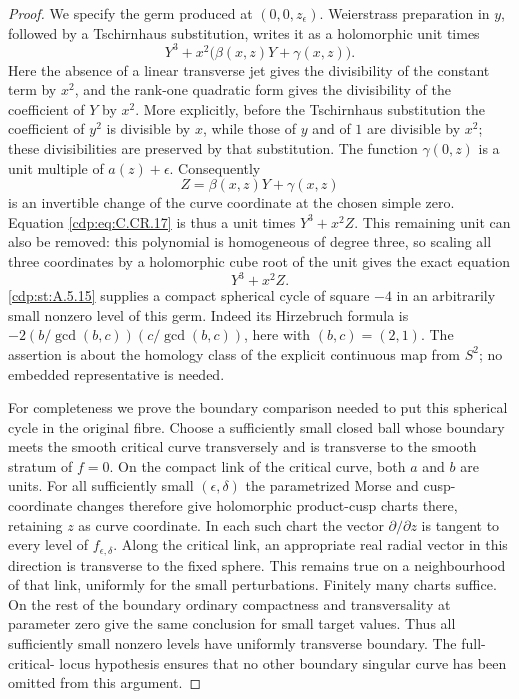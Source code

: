 \begin{proof}
We specify the germ produced at
$(0,0,z_\epsilon)$. Weierstrass preparation in $y$,
followed by a Tschirnhaus substitution, writes it as
a holomorphic unit times
\[
             Y^3+x^2\bigl(\beta(x,z)Y+\gamma(x,z)\bigr).
 \tag{C.CR.17}\label{cdp:eq:C.CR.17}
\]
Here the absence of a linear transverse jet gives
the divisibility of the constant term by $x^2$,
and the rank-one quadratic form gives the divisibility
of the coefficient of $Y$ by $x^2$. More explicitly,
before the Tschirnhaus substitution the coefficient
of $y^2$ is divisible by $x$, while those of $y$
and of $1$ are divisible by $x^2$; these divisibilities
are preserved by that substitution.
The function $\gamma(0,z)$ is a unit multiple of
$a(z)+\epsilon$. Consequently
\[
             Z=\beta(x,z)Y+\gamma(x,z)
\]
is an invertible change of the curve coordinate at
the chosen simple zero. Equation \eqref{cdp:eq:C.CR.17} is thus
a unit times $Y^3+x^2Z$. This remaining unit can
also be removed: this polynomial is homogeneous
of degree three, so scaling all three coordinates
by a holomorphic cube root of the unit gives the
exact equation
\[
                            Y^3+x^2Z.
 \tag{C.CR.18}\label{cdp:eq:C.CR.18}
\]
\ref{cdp:st:A.5.15} supplies a compact spherical cycle of square $-4$
in an arbitrarily small nonzero level of this germ.
Indeed its Hirzebruch formula is
$-2(b/\gcd(b,c))(c/\gcd(b,c))$, here with
$(b,c)=(2,1)$. The assertion is about the homology
class of the explicit continuous map from $S^2$;
no embedded representative is needed.

For completeness we prove the boundary comparison
needed to put this spherical cycle in the original fibre.
Choose a sufficiently small closed ball whose
boundary meets the smooth critical curve transversely
and is transverse to the smooth stratum of $f=0$.
On the compact link of the critical curve, both
$a$ and $b$ are units. For all sufficiently small
$(\epsilon,\delta)$ the parametrized Morse and
cusp-coordinate changes therefore give holomorphic
product-cusp charts there, retaining $z$ as curve
coordinate. In each such chart the vector
$\partial/\partial z$ is tangent to every level
of $f_{\epsilon,\delta}$. Along the critical link,
an appropriate real radial vector in this direction
is transverse to the fixed sphere. This remains
true on a neighbourhood of that link, uniformly
for the small perturbations. Finitely many charts
suffice. On the rest of the boundary ordinary
compactness and transversality at parameter zero
give the same conclusion for small target values.
Thus all sufficiently small nonzero levels have
uniformly transverse boundary. The full-critical-
locus hypothesis ensures that no other boundary
singular curve has been omitted from this argument.


\end{proof}
